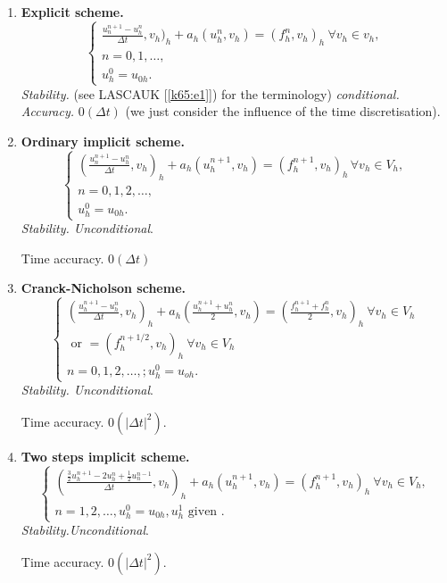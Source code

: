  \begin{enumerate}
 \item {\bf Explicit scheme.}\pageoriginale 
 \begin{equation}
\begin{cases}
\frac{u_n^{n+1} -u^n_h} {\Delta  t}, v_h )_h + a_h (u^n_h, v_h) = (f_h^n,v_h)_h \ \forall v_h \in v_h,\\ 
n = 0, 1,\ldots,\\
u^0_h = u_{0h}.\tag{3.1}\label{c3:eq3.1}
\end{cases}
 \end{equation}
 \textit{Stability.} (see LASCAUK [\ref{k65:e1}]) for the terminology)
 \textit{conditional.}  \textit{Accuracy.} $0(\Delta  t)$ (we just
 consider the influence of the time discretisation).  
 
 \item {\bf Ordinary implicit scheme.}
 \begin{equation}
\begin{cases}
\left(\frac{u_n^{n+1} -u^n_h} {\Delta  t}, v_h \right)_h + a_h (u^{n+1}_h, v_h) =
(f^{n+1}_h,v_h)_h \, \forall v_h \in V_h,\\ 
n = 0, 1,2,\ldots,\\
u^0_h = u_{0h}. \tag{3.2}\label{c3:eq3.2}
\end{cases}
 \end{equation}
\textit{Stability. Unconditional}. 

Time accuracy. $0 (\Delta  t)$

\item {\bf Cranck-Nicholson scheme.}
 \begin{equation}
\begin{cases}
\left(\frac{u^{n+1}_h - u^n_h} {\Delta  t}, v_h\right)_h + a_h
\left(\frac{u^{n+1}_h + u^n_h} {2}, v_h\right) = \left(\frac{f^{n+1}_h
  + f^n_h} {2} ,v_h\right)_h \ \forall v_h \in V_h\\ 
\text{ or } = (f^{n+1/2}_h, v_h)_h \ \forall v_h \in V_h \\
n = 0, 1,2 ,\ldots,; u^0_h = u_{oh}. \tag{3.3}\label{c3:eq3.3}
\end{cases}
\end{equation}
\textit {Stability. Unconditional}.  

Time accuracy. $0 (|\Delta  t|^2)$.

\item  {\bf Two steps implicit scheme.}
\begin{equation}
\begin{cases}
(\frac{\frac{3}{2} u^{n+1}_h -2u^n_h + \frac{1}{2} u^{n-1}_n} {\Delta
    t}, v_h)_h + a_h (u^{n+1}_h , v_h) = (f^{n+1}_h, v_h)_h \ \forall
  v_h \in V_h,\\ 
  n=1, 2,\ldots, u^0_h = u_{0h}, u^1_h \text { given
  }. \tag{3.4}\label{c3:eq3.4} 
\end{cases}
 \end{equation} 
 \textit{Stability.\pageoriginale   Unconditional}. 

 Time accuracy. $0 (|\Delta  t|^2)$.
 \end{enumerate}
  
